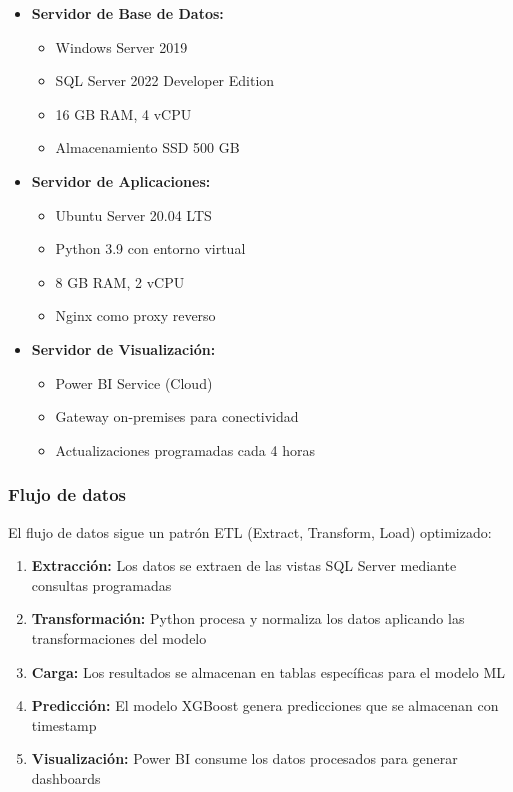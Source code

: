 \begin{itemize}
    \item \textbf{Servidor de Base de Datos:} 
    \begin{itemize}
        \item Windows Server 2019
        \item SQL Server 2022 Developer Edition
        \item 16 GB RAM, 4 vCPU
        \item Almacenamiento SSD 500 GB
    \end{itemize}
    
    \item \textbf{Servidor de Aplicaciones:}
    \begin{itemize}
        \item Ubuntu Server 20.04 LTS
        \item Python 3.9 con entorno virtual
        \item 8 GB RAM, 2 vCPU
        \item Nginx como proxy reverso
    \end{itemize}
    
    \item \textbf{Servidor de Visualización:}
    \begin{itemize}
        \item Power BI Service (Cloud)
        \item Gateway on-premises para conectividad
        \item Actualizaciones programadas cada 4 horas
    \end{itemize}
\end{itemize}

\subsubsection{Flujo de datos}

El flujo de datos sigue un patrón ETL (Extract, Transform, Load) optimizado:

\begin{enumerate}
    \item \textbf{Extracción:} Los datos se extraen de las vistas SQL Server mediante consultas programadas
    \item \textbf{Transformación:} Python procesa y normaliza los datos aplicando las transformaciones del modelo
    \item \textbf{Carga:} Los resultados se almacenan en tablas específicas para el modelo ML
    \item \textbf{Predicción:} El modelo XGBoost genera predicciones que se almacenan con timestamp
    \item \textbf{Visualización:} Power BI consume los datos procesados para generar dashboards
\end{enumerate}

